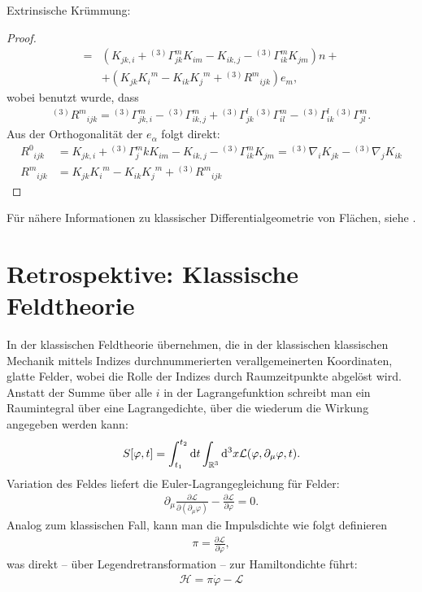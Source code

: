 \documentclass{scrartcl}
\newcommand{\inHS}{{}^{(3)}\!}
\begin{document}
\begin{paragraph}{Extrinsische Krümmung:}
\begin{proof}
\begin{align*}
										 =&(K_{jk,i}+\inHS\Gamma^m_{jk} K_{im}-K_{ik,j}-\inHS\Gamma^m_{ik}K_{jm})n+\\
										 &+(K_{jk}{K_i}^m-K_{ik}{K_j}^m+\inHS {R^m}_{ijk})e_m,
			\end{align*}
			wobei benutzt wurde, dass
			\begin{align*} 
				\inHS {R^m}_{ijk}=\inHS\Gamma^m_{jk,i}-\inHS\Gamma^m_{ik,j}+\inHS\Gamma^l_{jk}\inHS\Gamma^m_{il}-\inHS\Gamma^l_{ik}\inHS\Gamma^m_{jl}.
			\end{align*}
			Aus der Orthogonalität der $e_\alpha$ folgt direkt:
			\begin{align*}
				{R^0}_{ijk}&=K_{jk,i}+\inHS\Gamma^m_jk K_{im}-K_{ik,j}-\inHS\Gamma^m_{ik}K_{jm}=\inHS\nabla_i K_{jk}-\inHS\nabla_j K_{ik}\\
				{R^m}_{ijk}&=K_{jk}{K_i}^m-K_{ik}{K_j}^m+\inHS {R^m}_{ijk}
			\end{align*}
		\end{proof}
		Für nähere Informationen zu klassischer Differentialgeometrie von Flächen, siehe \cite{docarmo76}.
		\end{paragraph}
	\section{Retrospektive: Klassische Feldtheorie}
		In der klassischen Feldtheorie übernehmen, die in der klassischen klassischen
		Mechanik mittels Indizes durchnummerierten verallgemeinerten Koordinaten,
		glatte Felder, wobei die Rolle der Indizes durch Raumzeitpunkte abgelöst wird.
		Anstatt der Summe über alle $i$ in der Lagrangefunktion schreibt man ein
		Raumintegral über eine Lagrangedichte, über die wiederum die Wirkung angegeben werden
		kann:
		\begin{align}
			S[\varphi,t]=\int_{t_1}^{t_2}{\rm d}t\int_{\mathbb{R}^3}{\rm d}^3x \mathcal{L}(\varphi,\partial_\mu \varphi,t).
		\end{align}
		Variation des Feldes liefert die Euler-Lagrangegleichung für Felder:
		\begin{align}
			\partial_\mu \frac{\partial \mathcal{L}}{\partial (\partial_\mu \varphi)}-\frac{\partial \mathcal{L}}{\partial \varphi}=0.
		\end{align}
		Analog zum klassischen Fall, kann man die Impulsdichte wie folgt definieren
		\begin{align}
			\pi=\frac{\partial\mathcal{L}}{\partial \dot{\varphi}},
		\end{align}
		was direkt -- über Legendretransformation -- zur Hamiltondichte führt:
		\begin{align}
			\mathcal{H}=\pi\dot{\varphi}-\mathcal{L}
		\end{align}
\end{document}
